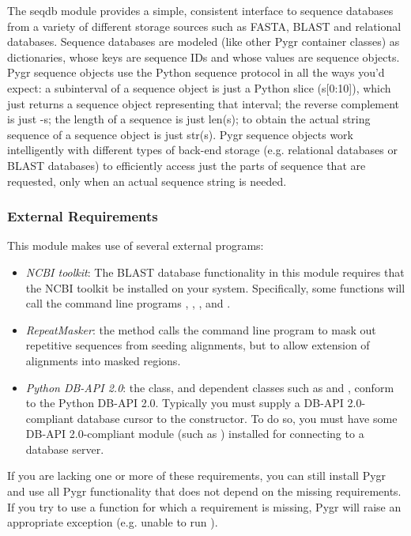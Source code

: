 \documentclass{howto}
\begin{document}
The seqdb module provides a simple, consistent interface to sequence databases from a variety of different storage sources such as FASTA, BLAST and relational databases.  Sequence databases are modeled (like other Pygr container classes) as dictionaries, whose keys are sequence IDs and whose values are sequence objects.  Pygr sequence objects use the Python sequence protocol in all the ways you'd expect: a subinterval of a sequence object is just a Python slice (s[0:10]), which just returns a sequence object representing that interval; the reverse complement is just -s; the length of a sequence is just len(s); to obtain the actual string sequence of a sequence object is just str(s).  Pygr sequence objects work intelligently with different types of back-end storage (e.g. relational databases or BLAST databases) to efficiently access just the parts of sequence that are requested, only when an actual sequence string is needed.

\subsubsection{External Requirements}
This module makes use of several external programs:
\begin{itemize}
\item
{\em NCBI toolkit}: The BLAST database functionality in this module 
requires that the NCBI toolkit
be installed on your system.  Specifically, some functions will call the command line
programs , , , and .

\item
{\em RepeatMasker}: the  method calls the command line
program  to mask out repetitive sequences from seeding alignments,
but to allow extension of alignments into masked regions.

\item
{\em Python DB-API 2.0}: the  class, and dependent classes such as 
 and , conform to the Python DB-API 2.0.
Typically you must supply a DB-API 2.0-compliant database cursor to the 
 constructor.  To do so, you must have some DB-API 2.0-compliant
module (such as ) installed for connecting to a database server.
\end{itemize} 

If you are lacking one or more of these requirements, you can still install Pygr
and use all Pygr functionality that does not depend on the missing requirements.
If you try to use a function for which a requirement is missing, Pygr will raise
an appropriate exception (e.g. unable to run ).
\end{document}

